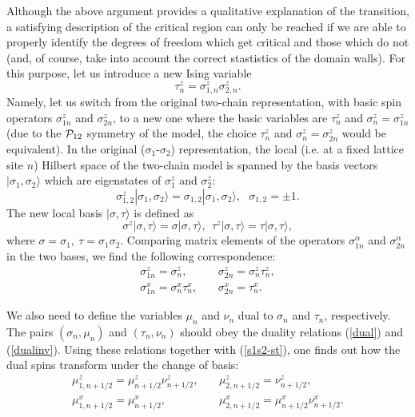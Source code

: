 Although the above argument provides a
qualitative explanation of the transition,
a satisfying description of the critical region can only be reached
if we are able to properly identify the degrees of freedom
which get critical and those which do not
(and, of course, take into account the correct stastistics
of the domain walls).
For this purpose, let us introduce a new Ising variable
\begin{equation}
\tau^z_n=\sigma^z_{1,n}\sigma^z_{2,n}.
\label{relation}
\end{equation}
Namely, let us switch from the original two-chain representation,
with basic spin operators $\sigma^z _{1n}$ and $\sigma^z _{2n}$,
to a new one where the basic variables
are $\tau^z_{n}$ and $\sigma^z _{n} = \sigma^z _{1n}$ (due to the ${\cal{P}}_{12}$
symmetry of the model, the choice $\tau^z_{n}$ and $\sigma^z _{n} = \sigma^z _{2n}$
would be equivalent). In the original ($\sigma_1$-$\sigma_2$) representation,
the local (i.e. at a fixed lattice site $n$) Hilbert space of the two-chain
model is spanned by the basis vectors $|\sigma_1, \sigma_2 \rangle$ which are eigenstates
of
$\sigma^z _{1}$ and $\sigma^z _{2}$:
$$
\sigma^z _{1,2} |\sigma_1, \sigma_2 \rangle = \sigma_{1,2} |\sigma_1, \sigma_2 \rangle,
~~~\sigma_{1,2} = \pm 1.
$$
The new local basis $|\sigma, \tau \rangle$ is defined as
$$
\sigma^z |\sigma, \tau \rangle = \sigma |\sigma, \tau \rangle, ~~
\tau^z |\sigma, \tau \rangle = \tau |\sigma, \tau \rangle ,
$$
where $\sigma = \sigma_1,~\tau =\sigma_1\sigma_2$. Comparing matrix elements of the
operators $\sigma^{\alpha}_{1n}$ and $\sigma^{\alpha}_{2n}$ in the two bases,
we find the following correspondence:
\begin{eqnarray}
\sigma^z _{1n} = \sigma^z _n, &~& \sigma^z _{2n} = \sigma^z _n \tau^z _n, \nonumber\\
\sigma^x _{1n} = \sigma^x _n \tau^x _n, &~& \sigma^x _{2n} = \tau^x _n.
\label{s1s2-st}
\end{eqnarray}

We also need to define the variables $\mu_n$ and
$\nu_n$ dual to $\sigma_n$ and $\tau_n$, respectively. The pairs
$(\sigma_n, \mu_n)$ and $(\tau_n,\nu_n )$ should obey the duality relations
(\ref{dual}) and (\ref{dualinv}). Using these relations together with
(\ref{s1s2-st}), one finds out how the dual spins transform under
the change of basis:
\begin{eqnarray}
\mu^z_{1,n+1/2} =\mu^z _{n+1/2} \nu^z _{n+1/2},
&~& \mu^z_{2,n+1/2} =\nu^z _{n+1/2},\nonumber\\
\mu^x_{1,n+1/2}=\mu^x _{n+1/2},
&~& \mu^x_{2,n+1/2}=\mu^x _{n+1/2}\nu^x _{n+1/2}.
\label{mu1mu2-munu}
\end{eqnarray}

